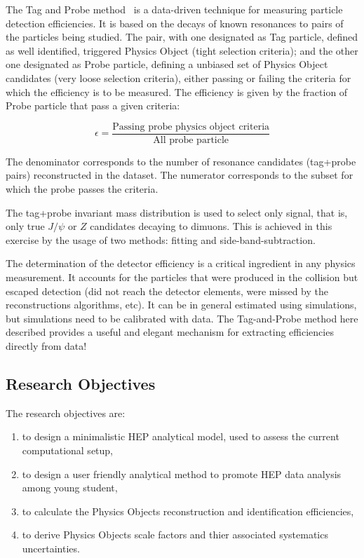 \documentclass[]{article}
\begin{document}
The Tag and Probe method~\cite{Behnke:1517556} is a data-driven technique for measuring particle detection efficiencies. It is based on the decays of known resonances to pairs of the particles being studied. The pair, with one designated as Tag particle, defined as well identified, triggered Physics Object (tight selection criteria); and the other one designated as Probe particle, defining a unbiased set of Physics Object candidates (very loose selection criteria), either passing or failing the criteria for which the efficiency is to be measured. The efficiency is given by the fraction of Probe particle that pass a given criteria:

\begin{equation}
  \epsilon = \frac{\mbox{Passing probe physics object criteria}}{\mbox{All probe particle}}
\end{equation}

The denominator corresponds to the number of resonance candidates (tag+probe pairs) reconstructed in the dataset. The numerator corresponds to the subset for which the probe passes the criteria.

The tag+probe invariant mass distribution is used to select only signal, that is, only true $J/\psi$ or $Z$ candidates decaying to dimuons. This is achieved in this exercise by the usage of two methods: fitting and side-band-subtraction.

The determination of the detector efficiency is a critical ingredient in any physics measurement. It accounts for the particles that were produced in the collision but escaped detection (did not reach the detector elements, were missed by the reconstructions algorithms, etc). It can be in general estimated using simulations, but simulations need to be calibrated with data. The Tag-and-Probe method here described provides a useful and elegant mechanism for extracting efficiencies directly from data!


%
%
\printbibliography[heading=none]

\subsection{Research Objectives}

The research objectives are:
\begin{enumerate}
  \item to design a minimalistic HEP analytical model, used to assess the current computational setup,
  \item to design a user friendly analytical method to promote HEP data analysis among young student,
  \item to calculate the Physics Objects reconstruction and identification efficiencies,
  \item to derive Physics Objects scale factors and thier associated systematics uncertainties.
\end{enumerate}
\end{document}
